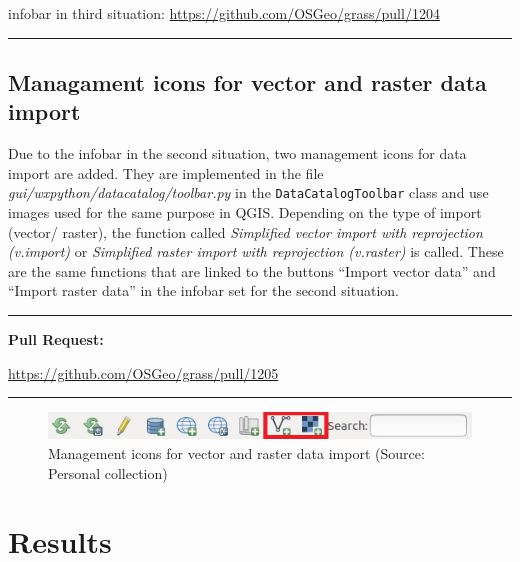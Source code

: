 \documentclass[a4paper,10pt,twoside]{article}
\begin{document}
infobar in third situation: \url{https://github.com/OSGeo/grass/pull/1204}
\par\noindent\rule{\textwidth}{0.4pt}

\subsection{Managament icons for vector and raster data import}

\noindent \large Due to the infobar in the second situation, two
management icons for data import are added. They are implemented in
the file \textit{gui/wxpython/datacatalog/toolbar.py} in the
\texttt{DataCatalogToolbar} class and use images used for the same
purpose in QGIS. Depending on the type of import (vector/ raster), the
function called \textit{Simplified vector import with reprojection
(v.import)} or \textit{Simplified raster import with reprojection
(v.raster)} is called. These are the same functions that are linked
to the buttons ``Import vector data'' and ``Import raster data'' in
the infobar set for the second situation.

\par\noindent\rule{\textwidth}{0.4pt}
\textbf{Pull Request:}

\url{https://github.com/OSGeo/grass/pull/1205}
\par\noindent\rule{\textwidth}{0.4pt}

\vspace{0.3cm}
\begin{figure}[hbt!] 
\begin{center}
\includegraphics[width=14cm]{../pictures/icons.png} 
\caption[Management icons for vector and raster data
  import]{Management icons for vector and raster data import (Source:
  Personal collection)}
\label{fig:icons}
\end{center}
\end{figure}

\newpage
\vspace*{-1cm}
\section{Results}
\label{sec:results}
\noindent
\large
\end{document}
